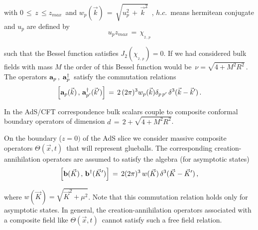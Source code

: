 \documentclass[a4paper,twocolumn,prd,groupedaddress,nofootinbib]{revtex4}
\begin{document}
\noindent with $0\,\le\,z\,\le z_{max}\,$
and $w_p(\vec k ) \,=\,\sqrt{ u_p^2\,+\,{\vec k}^2}\,$ , $h.c.\,$ 
means hermitean conjugate and  
$u_p$ are defined by 
\begin{equation}
\label{up}
u_p z_{max}\,=\, \chi_{_{2\,,\,p}}
\end{equation}

\noindent 
such that the Bessel function satisfies $ J_2 (\chi_{_{2\,,\,p}} )=0$. 
If we had considered bulk fields with mass $M$ the order of this Bessel 
function would be $\,\nu = \sqrt{4 + M^2 R^2}\,$. The operators 
${\bf a}_p\, ,\;{\bf a}^{\dagger}_p \,$ satisfy the commutation relations
\begin{equation}
\label{canonical1}
\Big[ {\bf a}_p(\vec k )\,,\,{\bf a}^\dagger_{p^\prime}({\vec k}^\prime  )
\Big]\,=\, 2\, (2\pi)^{3} w_p(\vec k )   
\delta_{p\,  p^\prime}\,\delta^{3} (\vec k -
{\vec k}^\prime )\,.
\end{equation}
 
\noindent In the AdS/CFT correspondence bulk scalars couple to 
composite conformal boundary operators of dimension 
$d \,=\, 2 + \sqrt{4 + M^2R^2}$.

On the boundary ($ z = 0)$ of the AdS slice we consider massive 
composite operators $\Theta(\vec x,t)\,$ that will represent 
glueballs. 
The corresponding creation-annihilation operators are assumed to 
satisfy the algebra (for asymptotic states) 
\begin{equation}
\label{canonical2}
\Big[ {\bf b}( \vec K )\,,\,{\bf b}^\dagger ({ \vec K }^\prime  )
\Big]\,=\, 2 (2\pi)^{3} \, w( \vec K ) \,\delta^3 ( \vec K -
{ \vec K}^\prime ) \,,
\end{equation}

\noindent where $ w(\vec K ) = \sqrt{ {\vec K}^2 + \mu^2}$. 
Note that this commutation relation holds only for
asymptotic states. In general, 
the creation-annihilation operators associated with a
composite field like $\Theta(\vec x,t)\,$ cannot satisfy 
such a free field relation.
\end{document}
